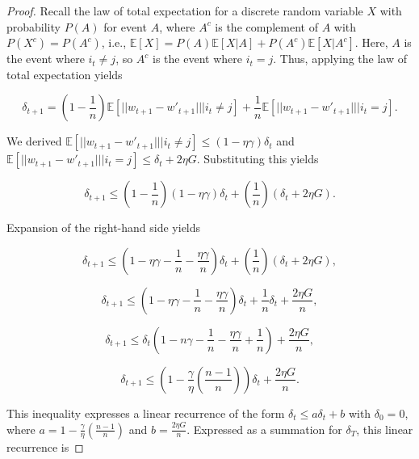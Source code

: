 \documentclass[twoside,11pt]{article}
\begin{document}
\begin{proof}
\noindent
Recall the law of total expectation for a discrete random variable $X$ with probability $P(A)$ for event $A$, where $A^c$ is the complement of $A$ with $P(X^c) = P(A^c)$, i.e., $\mathbb{E}[X] = P(A)\mathbb{E}[X|A] + P(A^c)\mathbb{E}[X|A^c]$. Here, $A$ is the event where $i_t \neq j$, so $A^c$ is the event where $i_t = j$. Thus, applying the law of total expectation yields

\begin{equation}
\delta_{t+1} = (1-\frac{1}{n})\mathbb{E}[||w_{t+1} - w'_{t+1}|| | i_t \neq j] + \frac{1}{n}\mathbb{E}[||w_{t+1} - w'_{t+1}|| | i_t = j].
\end{equation}

\noindent
We derived $\mathbb{E}[||w_{t+1} - w'_{t+1}|| | i_t \neq j] \leq (1-\eta\gamma)\delta_t$ and $\mathbb{E}[||w_{t+1} - w'_{t+1}|| | i_t = j] \leq \delta_t + 2\eta G$. Substituting this yields

\begin{equation}
\delta_{t+1} \leq (1-\frac{1}{n})(1-\eta\gamma)\delta_t + (\frac{1}{n})(\delta_t + 2\eta G).
\end{equation}

\noindent
Expansion of the right-hand side yields

\begin{equation}
\delta_{t+1} \leq (1 - \eta\gamma - \frac{1}{n} - \frac{\eta \gamma}{n})\delta_t + (\frac{1}{n})(\delta_t + 2\eta G),
\end{equation}

\begin{equation}
\delta_{t+1} \leq (1 - \eta\gamma - \frac{1}{n} - \frac{\eta \gamma}{n})\delta_t + \frac{1}{n}\delta_t + \frac{2\eta G}{n},
\end{equation}

\begin{equation}
\delta_{t+1} \leq \delta_t(1 - n\gamma - \frac{1}{n} - \frac{\eta\gamma}{n} + \frac{1}{n}) + \frac{2\eta G}{n},
\end{equation}

\begin{equation}
\delta_{t+1} \leq (1 - \frac{\gamma}{\eta}(\frac{n-1}{n}))\delta_t + \frac{2\eta G}{n}.
\end{equation}

\noindent
This inequality expresses a linear recurrence of the form $\delta_t \leq a\delta_t + b$ with $\delta_0 = 0$, where $a = 1 - \frac{\gamma}{\eta}(\frac{n-1}{n})$ and $b = \frac{2\eta G}{n}$. Expressed as a summation for $\delta_{T}$, this linear recurrence is


\end{proof}
\end{document}
